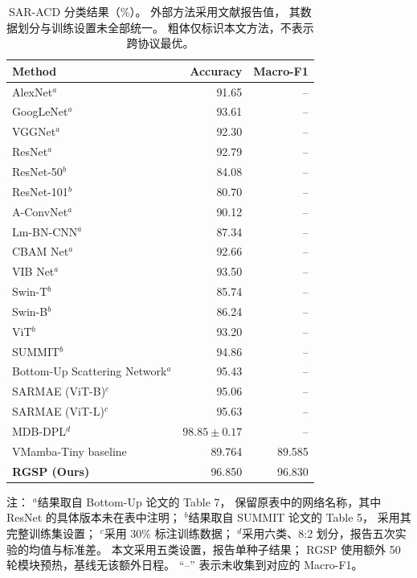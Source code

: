 \documentclass[journal]{IEEEtran}
\begin{document}
\begin{table}[!t]
\centering
\small
\setlength{\tabcolsep}{5pt}
\caption{SAR-ACD 分类结果（\%）。
外部方法采用文献报告值，
其数据划分与训练设置未全部统一。
粗体仅标识本文方法，不表示跨协议最优。}
\label{tab:sar_acd_comparison}

\begin{tabular}{lrr}
\toprule
Method & Accuracy & Macro-F1 \\
\midrule
AlexNet$^{a}$            & 91.65 & -- \\
GoogLeNet$^{a}$          & 93.61 & -- \\
VGGNet$^{a}$             & 92.30 & -- \\
ResNet$^{a}$             & 92.79 & -- \\
ResNet-50$^{b}$          & 84.08 & -- \\
ResNet-101$^{b}$         & 80.70 & -- \\
A-ConvNet$^{a}$          & 90.12 & -- \\
Lm-BN-CNN$^{a}$          & 87.34 & -- \\
CBAM Net$^{a}$           & 92.66 & -- \\
VIB Net$^{a}$            & 93.50 & -- \\
Swin-T$^{b}$             & 85.74 & -- \\
Swin-B$^{b}$             & 86.24 & -- \\
ViT$^{b}$                & 93.20 & -- \\
SUMMIT$^{b}$             & 94.86 & -- \\
Bottom-Up Scattering Network$^{a}$
                        & 95.43 & -- \\
SARMAE (ViT-B)$^{c}$     & 95.06 & -- \\
SARMAE (ViT-L)$^{c}$     & 95.63 & -- \\
MDB-DPL$^{d}$           & $98.85 \pm 0.17$ & -- \\
\midrule
VMamba-Tiny baseline    & 89.764 & 89.585 \\
\textbf{RGSP (Ours)}     & 96.850 & 96.830 \\
\bottomrule
\end{tabular}

\smallskip
\begin{minipage}{0.98\linewidth}
\footnotesize
注：
$^{a}$结果取自 Bottom-Up 论文的 Table 7，
保留原表中的网络名称，其中 ResNet 的具体版本未在表中注明；
$^{b}$结果取自 SUMMIT 论文的 Table 5，
采用其完整训练集设置；
$^{c}$采用 30\% 标注训练数据；
$^{d}$采用六类、8:2 划分，报告五次实验的均值与标准差。
本文采用五类设置，报告单种子结果；
RGSP 使用额外 50 轮模块预热，基线无该额外日程。
``--'' 表示未收集到对应的 Macro-F1。
\end{minipage}
\end{table}
\end{document}
